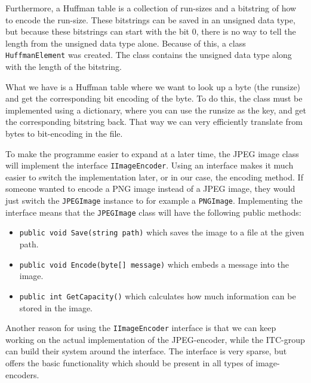 Furthermore, a Huffman table is a collection of run-sizes and a bitstring of how to encode the run-size.
These bitstrings can be saved in an unsigned data type, but because these bitstrings can start with the bit 0, there is no way to tell the length from the unsigned data type alone.
Because of this, a class \lstinline|HuffmanElement| was created.
The class contains the unsigned data type along with the length of the bitstring.

What we have is a Huffman table where we want to look up a byte (the runsize) and get the corresponding bit encoding of the byte.
To do this, the class must be implemented using a dictionary, where you can use the runsize as the key, and get the corresponding bitstring back.
That way we can very efficiently translate from bytes to bit-encoding in the file. 


To make the programme easier to expand at a later time, the JPEG image class will implement the interface \lstinline|IImageEncoder|.
Using an interface makes it much easier to switch the implementation later, or in our case, the encoding method.
If someone wanted to encode a PNG image instead of a JPEG image, they would just switch the \lstinline|JPEGImage| instance to for example a \lstinline|PNGImage|.
Implementing the interface means that the \lstinline|JPEGImage| class will have the following public methods:

\begin{itemize}
	\item \lstinline|public void Save(string path)| which saves the image to a file at the given path.
	\item \lstinline|public void Encode(byte[] message)| which embeds a message into the image.
	\item \lstinline|public int GetCapacity()| which calculates how much information can be stored in the image.
\end{itemize}

Another reason for using the \lstinline|IImageEncoder| interface is that we can keep working on the actual implementation of the JPEG-encoder, while the ITC-group can build their system around the interface.
The interface is very sparse, but offers the basic functionality which should be present in all types of image-encoders.